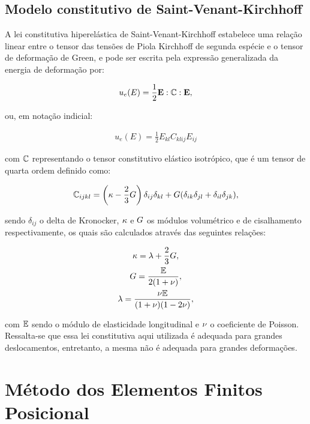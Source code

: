 \documentclass[tese_patricia]{subfiles}
\begin{document}
\subsection{Modelo constitutivo de Saint-Venant-Kirchhoff}

A lei constitutiva hiperelástica de Saint-Venant-Kirchhoff estabelece uma relação linear entre o tensor das tensões de Piola Kirchhoff de segunda espécie e o tensor de deformação de Green, e pode ser escrita pela expressão generalizada da energia de deformação por:

\begin{align}
u_{e}(E) = \frac{1}{2} \mathbf{E} : \mathbb{C} : \mathbf{E},
\end{align}

\noindent ou, em notação indicial:

\begin{align}
u_{e}(E) = \frac{1}{2} E_{kl} C_{klij} E_{ij}
\end{align}


\noindent com $\mathbb{C}$ representando o tensor constitutivo elástico isotrópico, que é um tensor de quarta ordem definido como:

\begin{gather}
\mathbb{C}_{ijkl}=\left(\kappa - \frac{2}{3}G \right)\delta_{ij}\delta_{kl} + G(\delta_{ik}\delta_{jl}+\delta_{il}\delta_{jk}),
\end{gather}

\noindent sendo $\delta_{ij}$ o delta de Kronocker, $\kappa$ e $G$ os módulos volumétrico e de cisalhamento respectivamente, os quais são calculados através das seguintes relações:

\begin{gather}
\kappa=\lambda+\frac{2}{3}G,\\
G=\frac{\mathbb{E}}{2(1+\nu)},\\
\lambda=\frac{\nu \mathbb{E}}{(1+\nu)(1-2\nu)},
\end{gather}

\noindent com $\mathbb{E}$ sendo o módulo de elasticidade longitudinal e $\nu$ o coeficiente de Poisson. Ressalta-se que essa lei constitutiva aqui utilizada é adequada para grandes deslocamentos, entretanto, a mesma não é adequada para grandes deformações.

\section{Método dos Elementos Finitos Posicional}
\end{document}
